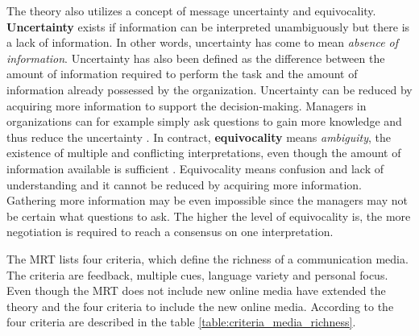 \documentclass[english,12pt,a4paper,pdftex]{article}
\begin{document}
The theory also utilizes a concept of message uncertainty and equivocality. \textbf{Uncertainty} exists if information can be interpreted unambiguously but there is a lack of information. In other words, uncertainty has come to mean \textit{absence of information}. Uncertainty has also been defined as the difference between the amount of information required to perform the task and the amount of information already possessed by the organization. Uncertainty can be reduced by acquiring more information to support the decision-making. Managers in organizations can for example simply ask questions to gain more knowledge and thus reduce the uncertainty \citep{daft1987}. In contract, \textbf{equivocality} means \textit{ambiguity}, the existence of multiple and conflicting interpretations, even though the amount of information available is sufficient \citep{daft1987}. Equivocality means confusion and lack of understanding and it cannot be reduced by acquiring more information. Gathering more information may be even impossible since the managers may not be certain what questions to ask. The higher the level of equivocality is, the more negotiation is required to reach a consensus on one interpretation.

The \ac{MRT} lists four criteria, which define the richness of a communication media. The criteria are feedback, multiple cues, language variety and personal focus. Even though the \ac{MRT} does not include new online media \citet{graveline2000} have extended the theory and the four criteria to include the new online media. According to \citet{graveline2000} the four criteria are described in the table \ref{table:criteria_media_richness}.
\end{document}
